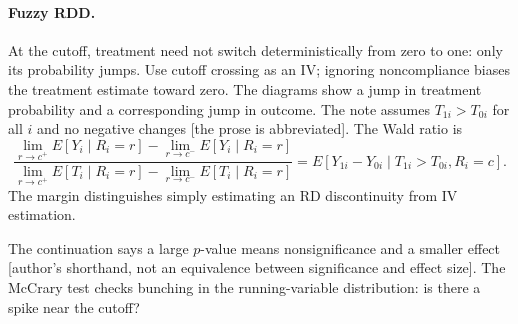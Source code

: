 \documentclass[11pt,a4paper]{article}
\begin{document}
{\paragraph{Fuzzy RDD.}
At the cutoff, treatment need not switch deterministically from zero to one: only its probability jumps. Use cutoff crossing as an IV; ignoring noncompliance biases the treatment estimate toward zero. The diagrams show a jump in treatment probability and a corresponding jump in outcome. The note assumes $T_{1i}>T_{0i}$ for all $i$ and no negative changes [the prose is abbreviated]. The Wald ratio is
\[
\frac{\lim_{r\to c^+}E[Y_i\mid R_i=r]-\lim_{r\to c^-}E[Y_i\mid R_i=r]}
{\lim_{r\to c^+}E[T_i\mid R_i=r]-\lim_{r\to c^-}E[T_i\mid R_i=r]}
=E[Y_{1i}-Y_{0i}\mid T_{1i}>T_{0i},R_i=c].
\]
The margin distinguishes simply estimating an RD discontinuity from IV estimation.

The continuation says a large $p$-value means nonsignificance and a smaller effect [author's shorthand, not an equivalence between significance and effect size]. The McCrary test checks bunching in the running-variable distribution: is there a spike near the cutoff?

\begin{center}
\end{center}}
\end{document}
